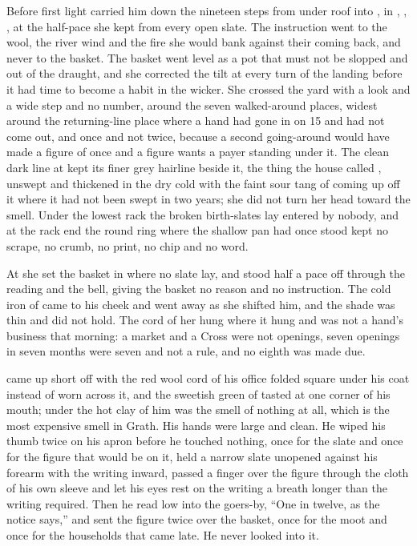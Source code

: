 Before first light  carried him down the nineteen steps from under  roof into , in , , , at the half-pace she kept from every open slate. The instruction went to the wool, the river wind and the fire she would bank against their coming back, and never to the basket. The basket went level as a pot that must not be slopped and out of the draught, and she corrected the tilt at every turn of the landing before it had time to become a habit in the wicker. She crossed the yard with a look and a wide step and no number, around the seven walked-around places, widest around the returning-line place where a hand had gone in on  15 and had not come out, and once and not twice, because a second going-around would have made a figure of once and a figure wants a payer standing under it. The clean dark line at  kept its finer grey hairline beside it, the thing the house called , unswept and thickened in the dry cold with the faint sour tang of  coming up off it where it had not been swept in two years; she did not turn her head toward the smell. Under the lowest rack the broken birth-slates lay entered by nobody, and at the rack end the round ring where the shallow pan had once stood kept no scrape, no crumb, no print, no chip and no word.

At  she set the basket in  where no slate lay, and stood half a pace off through the reading and the bell, giving the basket no reason and no instruction. The cold iron of  came to his cheek and went away as she shifted him, and the shade was thin and did not hold. The cord of her  hung where it hung and was not a hand's business that morning: a market and a Cross were not openings, seven openings in seven months were seven and not a rule, and no eighth was made due.

\scenebreak

 came up short off  with the red wool cord of his office folded square under his coat instead of worn across it, and the sweetish green of tasted  at one corner of his mouth; under the hot clay of him was the smell of nothing at all, which is the most expensive smell in Grath. His hands were large and clean. He wiped his thumb twice on his apron before he touched nothing, once for the slate and once for the figure that would be on it, held a narrow slate unopened against his forearm with the writing inward, passed a finger over the figure through the cloth of his own sleeve and let his eyes rest on the writing a breath longer than the writing required. Then he read low into the goers-by, “One in twelve, as the notice says,” and sent the figure twice over the basket, once for the moot and once for the households that came late. He never looked into it.

